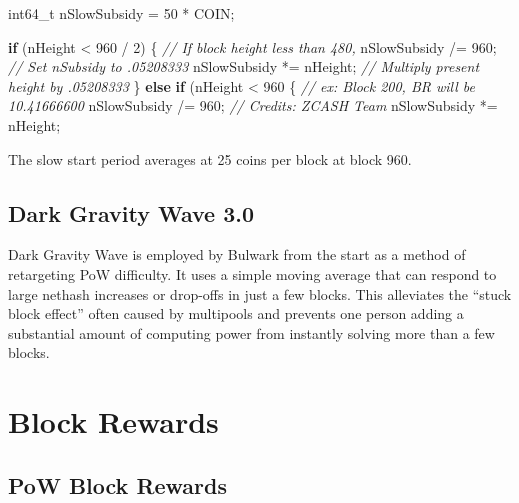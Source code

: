 \documentclass[11pt,a4paperpaper,]{report}
\newenvironment{Shaded}{}{}
\newcommand{\DataTypeTok}[1]{\textcolor[rgb]{0.56,0.13,0.00}{#1}}
\newcommand{\DecValTok}[1]{\textcolor[rgb]{0.25,0.63,0.44}{#1}}
\newcommand{\CommentTok}[1]{\textcolor[rgb]{0.38,0.63,0.69}{\textit{#1}}}
\newcommand{\ControlFlowTok}[1]{\textcolor[rgb]{0.00,0.44,0.13}{\textbf{#1}}}
\newcommand{\NormalTok}[1]{#1}
\begin{document}
\begin{Shaded}
\begin{Highlighting}[]

        \DataTypeTok{int64_t}\NormalTok{ nSlowSubsidy = }\DecValTok{50}\NormalTok{ * COIN;}

        \ControlFlowTok{if}\NormalTok{ (nHeight < }\DecValTok{960}\NormalTok{ / }\DecValTok{2}\NormalTok{) \{        }\CommentTok{// If block height less than 480,}
\NormalTok{           nSlowSubsidy /= }\DecValTok{960}\NormalTok{;         }\CommentTok{// Set nSubsidy to .05208333}
\NormalTok{           nSlowSubsidy *= nHeight;     }\CommentTok{// Multiply present height by .05208333}
\NormalTok{        \} }\ControlFlowTok{else} \ControlFlowTok{if}\NormalTok{ (nHeight < }\DecValTok{960}\NormalTok{ \{      }\CommentTok{// ex: Block 200, BR will be 10.41666600}
\NormalTok{            nSlowSubsidy /= }\DecValTok{960}\NormalTok{;        }\CommentTok{// Credits: ZCASH Team}
\NormalTok{            nSlowSubsidy *= nHeight;}
\end{Highlighting}
\end{Shaded}

The slow start period averages at 25 coins per block at block 960.

\section{Dark Gravity Wave 3.0}\label{dark-gravity-wave-3.0}

Dark Gravity Wave is employed by Bulwark from the start as a method of
retargeting PoW difficulty. It uses a simple moving average that can
respond to large nethash increases or drop-offs in just a few blocks.
This alleviates the ``stuck block effect'' often caused by multipools
and prevents one person adding a substantial amount of computing power
from instantly solving more than a few blocks.

\chapter{Block Rewards}\label{block-rewards}

\section{PoW Block Rewards}\label{pow-block-rewards}
\end{document}
